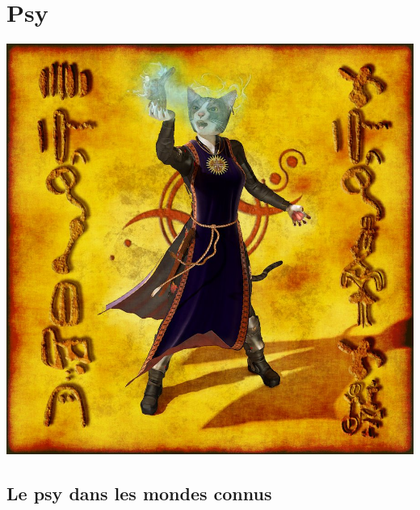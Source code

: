 \part{Psy}

	\begin{center}
	\includegraphics[scale=0.25]{Img/teldrim_psy}
	\end{center}

\chapter{Le psy dans les mondes connus}

